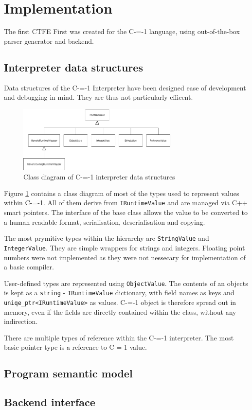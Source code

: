 \section{Implementation}
\label{implementation}

The first CTFE First was created for the C-=-1 language, using out-of-the-box parser generator and backend.

\subsection{Interpreter data structures}

Data structures of the C-=-1 Interpreter have been designed ease of development and debugging in mind.
They are thus not particularly efficent.

\begin{figure}
	\includegraphics[width=8cm]{pictures/interpreter_data_structures_uml.png}
	\caption{Class diagram of C-=-1 interpreter data structures}
	\label{fig:interpreter_data_structures}
\end{figure}

Figure \ref{fig:interpreter_data_structures} contains a class diagram of most of the types used to represent values within C-=-1.
All of them derive from \lstinline{IRuntimeValue} and are managed via C++ smart pointers.
The interface of the base class allows the value to be converted to a human readable format, serialisation, deserialisation and copying.

The most prymitive types within the hierarchy are \lstinline{StringValue} and \lstinline{IntegerValue}.
They are simple wrappers for strings and integers.
Floating point numbers were not implemented as they were not nessecary for implementation of a basic compiler.

User-defined types are represented using \lstinline{ObjectValue}.
The contents of an objects is kept as a \lstinline{string} - \lstinline{IRuntimeValue} dictionary, with field names as keys and \lstinline{uniqe_ptr<IRuntimeValue>} as values.
C-=-1 object is therefore spread out in memory, even if the fields are directly contained within the class, without any indirection.

There are multiple types of reference within the C-=-1 interpreter.
The most basic pointer type is a reference to C-=-1 value.

\subsection{Program semantic model}

\subsection{Backend interface}
\label{implementation/backend-interface}
